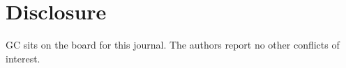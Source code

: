 \section*{Disclosure}
\noindent GC sits on the board for this journal. The authors report no other conflicts of interest.